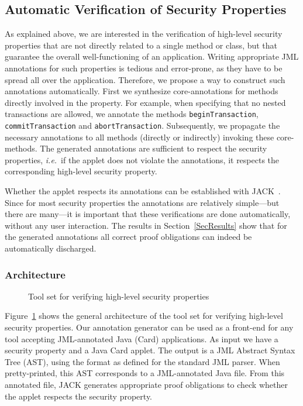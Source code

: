\subsection{Automatic Verification of Security Properties}\label{SecVerif}

As explained above, we are interested in the verification of
high-level security properties that are not directly related to a
single method or class, but that guarantee the overall
well-functioning of an application. Writing appropriate JML
annotations for such properties is tedious and error-prone, as they
have to be spread all over the application. Therefore, we propose a
way to construct such annotations automatically. First we synthesize
core-annotations for methods directly involved in the property.  For
example, when specifying that no nested transactions are allowed, we
annotate the methods \texttt{beginTransaction},
\texttt{commitTransaction} and
\texttt{abortTransaction}. Subsequently, we propagate the necessary 
annotations to all methods (directly or indirectly) invoking these
core-methods.  The generated annotations are sufficient to respect the
security properties, \emph{i.e.}~if the applet does not violate the
annotations, it respects the corresponding high-level security
property.

Whether the applet respects its annotations can be established with
JACK~\cite{BRL-JACK}.
Since
for most security properties the annotations are relatively
simple---but there are many---it is important that these verifications
are done automatically, without any user interaction. The results in
Section~\ref{SecResults} show that for the generated annotations all
correct proof obligations can indeed be automatically discharged.

\subsubsection{Architecture}

\begin{figure}[p]
\begin{center}
\end{center}
\caption{\sc Tool set for verifying high-level security properties}\label{FigArch}
\end{figure}



Figure~\ref{FigArch} shows the general architecture of the tool set
for verifying high-level security properties. Our annotation generator
can be used as a front-end for any tool accepting JML-annotated Java
(Card) applications. As input we have a security property and a Java
Card applet. The output is a JML Abstract Syntax Tree (AST), using the
format as defined for the standard JML parser. When pretty-printed,
this AST corresponds to a JML-annotated Java file. From this
annotated file, JACK generates appropriate proof obligations to check
whether the applet respects the security property.

